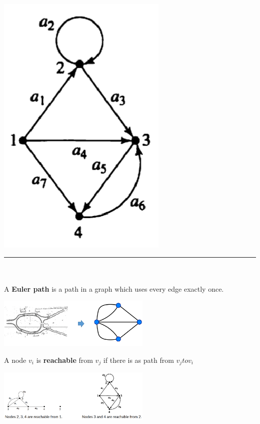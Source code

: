 \documentclass[12pt, letterpaper]{article}
\newcommand{\horizline}[0]{\noindent\rule{\textwidth}{1pt}\\}
\begin{document}
\begin{minipage}[t]{0.15\linewidth}
    \centering
    \strut\vspace*{\baselineskip}\newline\includegraphics[width=\linewidth]{graphex5.png} \smallbreak
\end{minipage}
\smallbreak
\horizline\\
A \textbf{Euler path} is a path in a graph which uses every edge exactly once.
\begin{center}
	\includegraphics*[width=0.55\textwidth]{euler.png}	
\end{center}
\bigbreak
A node $v_i$ is \textbf{reachable} from $v_j$ if there is as path from $v_j to v_i$
\begin{center}
	\includegraphics*[width=0.55\textwidth]{graphre.png}	
\end{center}
\end{document}
